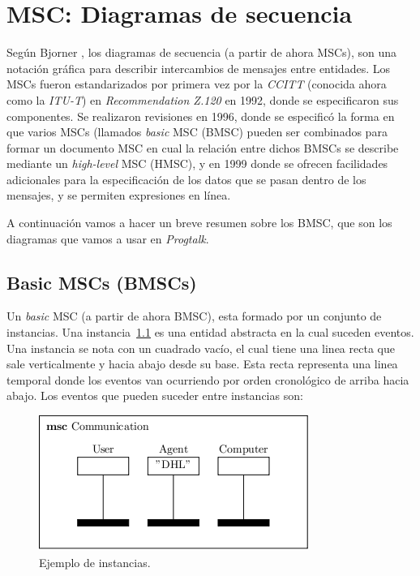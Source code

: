 \chapter{MSC: Diagramas de secuencia}
\label{ch:msc}

Según Bjorner \cite{bjorner}, los diagramas de secuencia (a partir de
ahora MSCs),  son una notación gráfica para describir
intercambios de mensajes entre entidades. Los MSCs fueron
estandarizados por primera vez por la \textit{CCITT} (conocida ahora
como la \textit{ITU-T}) en \textit{Recommendation Z.120} en 1992,
donde se especificaron sus componentes.
Se realizaron revisiones en 1996, donde se especificó la
forma en que varios MSCs (llamados \textit{basic} MSC (BMSC) pueden
ser combinados para formar un documento MSC en cual la relación entre
dichos BMSCs se describe mediante un \textit{high-level} MSC (HMSC), y
en 1999 donde se ofrecen facilidades adicionales para la
especificación de los datos que se pasan dentro de los mensajes, y se
permiten expresiones en línea.

A continuación vamos a hacer un breve resumen sobre los BMSC, que son
los diagramas que vamos a usar en \textit{Progtalk}.

\section{Basic MSCs (BMSCs)}
Un \textit{basic} MSC (a partir de ahora BMSC), esta formado por un
conjunto de instancias. Una instancia~\ref{fig:instances} es una
entidad abstracta en la cual suceden eventos. Una instancia se nota
con un cuadrado vacío, el cual tiene una linea recta que sale
verticalmente y hacia abajo desde su base. Esta recta representa una
linea temporal donde los eventos van ocurriendo por orden cronológico
de arriba hacia abajo. Los eventos que pueden suceder entre instancias son:

\begin{figure}
  \centering
  \includegraphics[scale=1]{./images/instances.png}
  \caption{Ejemplo de instancias.}
  \label{fig:instances}
\end{figure}

